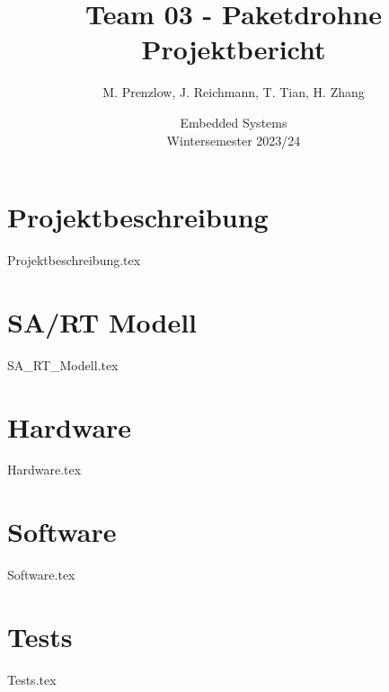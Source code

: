 \documentclass[a4paper,11pt,oneside]{article}
\title{Team 03 - Paketdrohne \\ \textbf{Projektbericht}}
\author{M. Prenzlow, J. Reichmann, T. Tian, H. Zhang}
\date{Embedded Systems \\ Wintersemester 2023/24}
\begin{document}
\pagestyle{fancy}
\maketitle
\newpage

\tableofcontents
\newpage


\section{Projektbeschreibung}
{Projektbeschreibung.tex}

\section{SA/RT Modell}
{SA_RT_Modell.tex}

\section{Hardware}
{Hardware.tex}
\newpage

\section{Software}
{Software.tex}

\newpage
\section{Tests}
{Tests.tex}

\newpage
\printbibliography
\listoffigures
\listoftables
\end{document}

